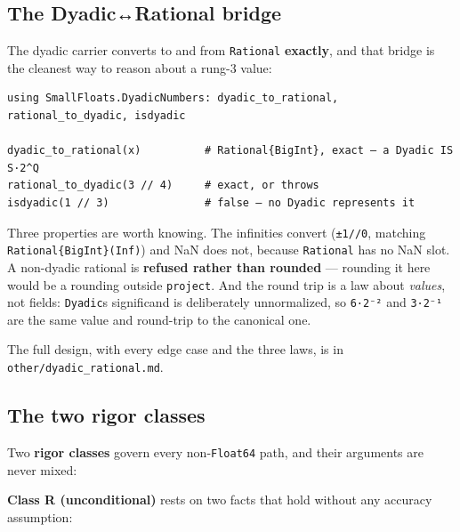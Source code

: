 \subsection{The Dyadic↔Rational bridge}



\label{15909861321242845690}{}


The dyadic carrier converts to and from \texttt{Rational} \textbf{exactly}, and that bridge is the cleanest way to reason about a rung-3 value:




\nopagebreak[4]
\begin{verbatim}
using SmallFloats.DyadicNumbers: dyadic_to_rational, rational_to_dyadic, isdyadic

dyadic_to_rational(x)          # Rational{BigInt}, exact — a Dyadic IS S·2^Q
rational_to_dyadic(3 // 4)     # exact, or throws
isdyadic(1 // 3)               # false — no Dyadic represents it
\end{verbatim}



Three properties are worth knowing. The infinities convert (\texttt{±1//0}, matching \texttt{Rational\{BigInt\}(Inf)}) and NaN does not, because \texttt{Rational} has no NaN slot. A non-dyadic rational is \textbf{refused rather than rounded} — rounding it here would be a rounding outside \texttt{project}. And the round trip is a law about \emph{values}, not fields: \texttt{Dyadic}{\textquotesingle}s significand is deliberately unnormalized, so \texttt{6·2⁻²} and \texttt{3·2⁻¹} are the same value and round-trip to the canonical one.



The full design, with every edge case and the three laws, is in \texttt{other/\allowbreak{}dyadic\_\allowbreak{}rational.md}.



\subsection{The two rigor classes}



\label{15034539620333151856}{}


Two \textbf{rigor classes} govern every non-\texttt{Float64} path, and their arguments are never mixed:



\textbf{Class R (unconditional)} rests on two facts that hold without any accuracy assumption:



